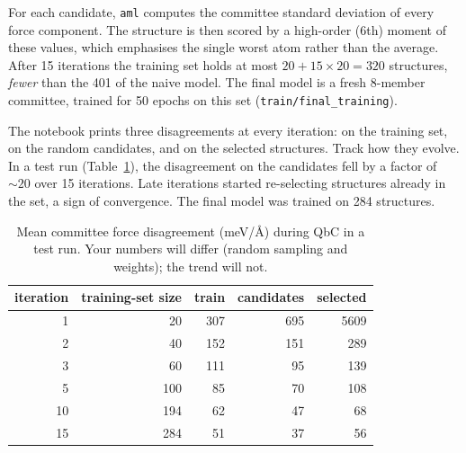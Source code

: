 \documentclass[11pt,a4paper]{article}
\begin{document}
\begin{center}
\end{center}

\noindent
For each candidate, \texttt{aml} computes the committee standard deviation of
every force component. The structure is then scored by a high-order
(6th) moment of these values, which emphasises the single worst atom rather
than the average. After 15 iterations the training set holds at most
$20+15\times20 = 320$ structures, \emph{fewer} than the 401 of the naive
model. The final model is a fresh 8-member committee, trained for 50 epochs
on this set (\texttt{train/final\_training}).

The notebook prints three disagreements at every iteration: on the training
set, on the random candidates, and on the selected structures. Track how they
evolve. In a test run (Table~\ref{tab:qbc}), the disagreement on the
candidates fell by a factor of $\sim\!20$ over 15 iterations. Late
iterations started re-selecting structures already in the set, a sign of
convergence. The final model was trained on 284 structures.

\begin{table}[h]
\centering\small
\caption{Mean committee force disagreement (\si{meV/\angstrom}) during QbC
in a test run. Your numbers will differ (random sampling and weights); the
trend will not.}
\label{tab:qbc}
\begin{tabular}{@{}rrrrr@{}}
\toprule
iteration & training-set size & train & candidates & selected\\
\midrule
1  & 20  & 307 & 695 & 5609\\
2  & 40  & 152 & 151 & 289\\
3  & 60  & 111 &  95 & 139\\
5  & 100 &  85 &  70 & 108\\
10 & 194 &  62 &  47 &  68\\
15 & 284 &  51 &  37 &  56\\
\bottomrule
\end{tabular}
\end{table}
\end{document}
